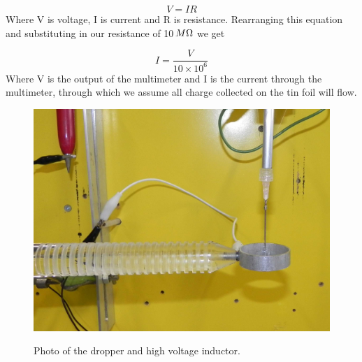 \begin{equation}
V=IR
\end{equation}
Where V is voltage, I is current and R is resistance. Rearranging
this equation and substituting in our resistance of 10$\thinspace M\Omega$
we get

\begin{equation}
I=\frac{V}{10\times10^{6}}
\end{equation}
Where V is the output of the multimeter and I is the current through
the multimeter, through which we assume all charge collected on the
tin foil will flow.

\begin{figure}
\begin{centering}
\includegraphics[scale=0.15]{content/appendices/chargedWaterDrops/graphics/Photo_dripperExperiment_Inductor_draft.JPG}
\par\end{centering}

\begin{raggedright}
\protect\caption{Photo of the dropper and high voltage inductor.}

\par\end{raggedright}

\raggedright{}\label{Photo_dripperExperiment_Inductor}
\end{figure}


